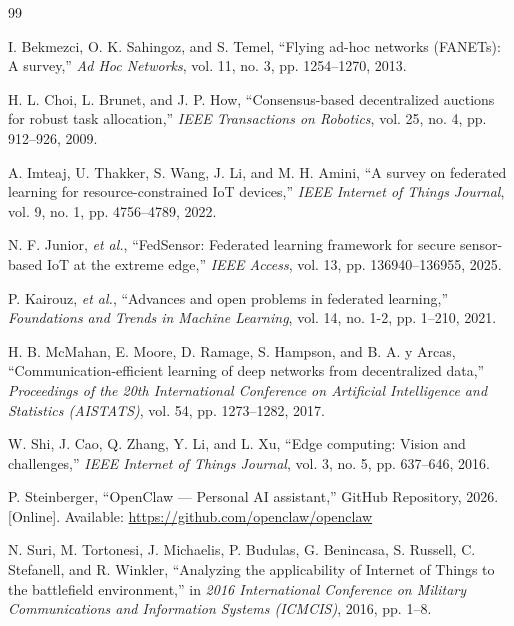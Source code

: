 \begin{thebibliography}{99}

I. Bekmezci, O. K. Sahingoz, and S. Temel, ``Flying ad-hoc networks (FANETs): A survey,'' \textit{Ad Hoc Networks}, vol. 11, no. 3, pp. 1254--1270, 2013.

H. L. Choi, L. Brunet, and J. P. How, ``Consensus-based decentralized auctions for robust task allocation,'' \textit{IEEE Transactions on Robotics}, vol. 25, no. 4, pp. 912--926, 2009.

A. Imteaj, U. Thakker, S. Wang, J. Li, and M. H. Amini, ``A survey on federated learning for resource-constrained IoT devices,'' \textit{IEEE Internet of Things Journal}, vol. 9, no. 1, pp. 4756--4789, 2022.

N. F. Junior, \textit{et al.}, ``FedSensor: Federated learning framework for secure sensor-based IoT at the extreme edge,'' \textit{IEEE Access}, vol. 13, pp. 136940--136955, 2025.

P. Kairouz, \textit{et al.}, ``Advances and open problems in federated learning,'' \textit{Foundations and Trends in Machine Learning}, vol. 14, no. 1-2, pp. 1--210, 2021.

H. B. McMahan, E. Moore, D. Ramage, S. Hampson, and B. A. y Arcas, ``Communication-efficient learning of deep networks from decentralized data,'' \textit{Proceedings of the 20th International Conference on Artificial Intelligence and Statistics (AISTATS)}, vol. 54, pp. 1273--1282, 2017.

W. Shi, J. Cao, Q. Zhang, Y. Li, and L. Xu, ``Edge computing: Vision and challenges,'' \textit{IEEE Internet of Things Journal}, vol. 3, no. 5, pp. 637--646, 2016.

P. Steinberger, ``OpenClaw — Personal AI assistant,'' GitHub Repository, 2026. [Online]. Available: \url{https://github.com/openclaw/openclaw}

N. Suri, M. Tortonesi, J. Michaelis, P. Budulas, G. Benincasa, S. Russell, C. Stefanell, and R. Winkler, ``Analyzing the applicability of Internet of Things to the battlefield environment,'' in \textit{2016 International Conference on Military Communications and Information Systems (ICMCIS)}, 2016, pp. 1--8.

\end{thebibliography}


